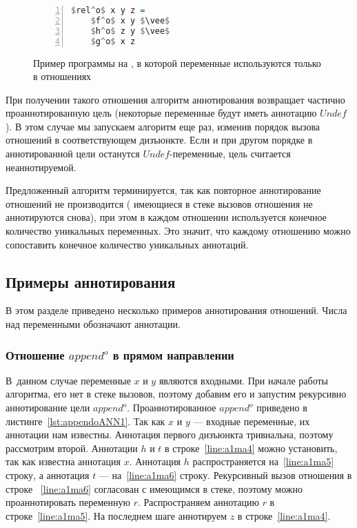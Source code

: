 \documentclass[conference,american,russian]{IEEEtran}
\begin{document}
\begin{figure}[h!]
  \begin{center}
  \begin{minipage}{0.18\textwidth}
  \begin{lstlisting}[language=Haskell, frame=single, numbers=left,numberstyle=\small, escapechar=|]
  $rel^o$ x y z =
    $f^o$ x y $\vee$
    $h^o$ z y $\vee$
    $g^o$ x z
    \end{lstlisting}
  \end{minipage}
  \end{center}
  \caption{Пример программы на \miniKanren{}, в которой переменные используются только в отношениях}
  \label{lst:reloDEF}
\end{figure}

При получении такого отношения алгоритм аннотирования возвращает частично проаннотированную цель (некоторые переменные будут иметь аннотацию  $Undef$).
В этом случае мы запускаем алгоритм еще раз, изменив порядок вызова отношений в соответствующем дизъюнкте.
Если и при другом порядке в аннотированной цели останутся $Undef$-переменные, цель считается неаннотируемой.

Предложенный алгоритм терминируется, так как повторное аннотирование отношений не производится ( имеющиеся в стеке вызовов отношения не аннотируются снова), при этом в каждом отношении используется конечное количество уникальных переменных. 
Это значит, что каждому отношению можно сопоставить конечное количество уникальных аннотаций.

\subsection{Примеры аннотирования}

В этом разделе приведено несколько примеров аннотирования отношений.
Числа над переменными обозначают аннотации.

\subsubsection{Отношение $append^o$ в прямом направлении}

В~данном случае  переменные $x$ и $y$ являются входными. 
При начале работы алгоритма, его нет в стеке вызовов, поэтому добавим его и запустим рекурсивно аннотирование цели $append^o$. 
Проаннотированное $append^o$ приведено в листинге~\ref{lst:appendoANN1}.
Так как $x$ и $y$ --- входные переменные, их аннотации нам известны.
Аннотация первого дизъюнкта тривиальна, поэтому рассмотрим второй.
Аннотации $h$ и $t$ в строке~\ref{line:a1ma4} можно установить, так как известна аннотация $x$.
Аннотация $h$ распространяется на~\ref{line:a1ma5} строку, а аннотация $t$ --- на~\ref{line:a1ma6} строку.
Рекурсивный вызов отношения в строке ~\ref{line:a1ma6} согласован с имеющимся в стеке, поэтому можно проаннотировать переменную $r$.
Распространяем аннотацию $r$ в строке~\ref{line:a1ma5}.
На последнем шаге аннотируем $z$ в строке~\ref{line:a1ma4}.
\end{document}
